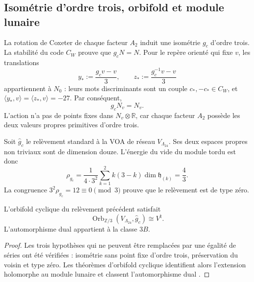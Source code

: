 \subsection{Isométrie d'ordre trois, orbifold et module lunaire}

La rotation de Coxeter de chaque facteur \(A_2\) induit une isométrie
\(g_c\) d'ordre trois. La stabilité du code \(C_W\) prouve que
\(g_cN=N\). Pour le repère orienté qui fixe \(v\), les translations
\begin{equation}
 y_*:=\frac{g_cv-v}{3},
 \qquad
 z_*:=\frac{g_c^{-1}v-v}{3}
 \label{eq:exc-desplazamientos-vecino}
\end{equation}
appartiennent à \(N_0\) : leurs mots discriminants sont un couple
\(c_*,-c_*\in C_W\), et
\(\langle y_*,v\rangle=\langle z_*,v\rangle=-27\). Par conséquent,
\begin{equation}
 g_cN_v=N_v.
 \label{eq:exc-preservacion-vecino}
\end{equation}
L'action n'a pas de points fixes dans \(N_v\otimes\mathbb R\), car chaque
facteur \(A_2\) possède les deux valeurs propres primitives d'ordre trois.

Soit \(\widehat g_c\) le relèvement standard à la VOA de réseau
\(V_{\Lambda_{24}}\). Ses deux espaces propres non triviaux sont de dimension
douze. L'énergie du vide du module tordu est donc
\begin{equation}
 \rho_{g_c}
 =\frac1{4\cdot3^2}
 \sum_{k=1}^{2}k(3-k)\dim\mathfrak h_{(k)}
 =\frac43.
 \label{eq:exc-peso-torcido}
\end{equation}
La congruence \(3^2\rho_{g_c}=12\equiv0\pmod3\) prouve que le relèvement
est de type zéro.

\begin{theorem}
\label{thm:exc-orbifold}
L'orbifold cyclique du relèvement précédent satisfait
\begin{equation}
 \operatorname{Orb}_{\mathbb Z/3}
 (V_{\Lambda_{24}},\widehat g_c)\cong V^\natural.
 \label{eq:exc-orbifold}
\end{equation}
L'automorphisme dual appartient à la classe \(3B\).
\end{theorem}

\begin{proof}
Les trois hypothèses qui ne peuvent être remplacées par une
égalité de séries ont été vérifiées : isométrie sans point fixe d'ordre trois, préservation du
voisin et type zéro. Les théorèmes d'orbifold cyclique identifient alors
l'extension holomorphe au module lunaire et classent l'automorphisme dual
\citep{ChenLamShimakura2016,AbeLamYamada2017,Carnahan2017}.
\end{proof}

